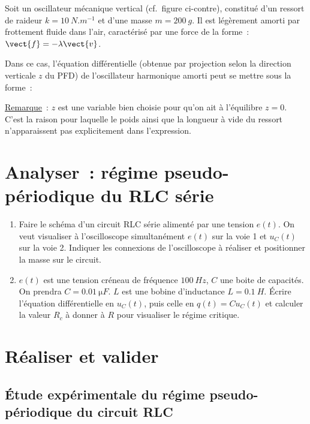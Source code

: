 \documentclass[a4paper, 11pt, final, garamond]{book}
\begin{document}
Soit un oscillateur mécanique vertical (cf.\ figure ci-contre), constitué d'un
ressort de raideur $k = \SI{10}{N.m^{-1}}$ et d'une masse $m = \SI{200}{g}$. Il
est légèrement amorti par frottement fluide dans l'air, caractérisé par une
force de la forme~: $\vect{f}= - \lambda\vect{v}$. 

\medskip

Dans ce cas, l'équation différentielle (obtenue par projection selon la direction verticale $z$ du PFD) de l'oscillateur harmonique amorti peut se mettre sous la forme~:


\underline{Remarque}~: $z$ est une variable bien choisie pour qu'on ait à
l'équilibre $z=0$. C'est la raison pour laquelle le poids ainsi que la longueur
à vide du ressort n'apparaissent pas explicitement dans l'expression. 

\section{Analyser~: régime pseudo-périodique du RLC série}

\begin{enumerate}
    \item Faire le schéma d'un circuit RLC série alimenté par une tension
        $e(t)$. On veut visualiser à l'oscilloscope simultanément $e(t)$ sur la
        voie 1 et $u_{C}(t)$ sur la voie 2. Indiquer les connexions de
        l'oscilloscope à réaliser et positionner la masse sur le circuit.

    \item $e(t)$ est une tension créneau de fréquence $\SI{100}{Hz}$, $C$ une
        boite de capacités. On prendra $C = \SI{0,01}{\micro F}$. $L$ est une
        bobine d'inductance $L= \SI{0,1}{H}$. Écrire l'équation différentielle
        en $u_{C}(t)$, puis celle en $q(t) = C u_{C}(t)$ et calculer la valeur
        $R_{c}$ à donner à $R$ pour visualiser le régime critique.
\end{enumerate}

\section{Réaliser et valider}

\subsection{Étude expérimentale du régime pseudo-périodique du circuit RLC}
\end{document}

